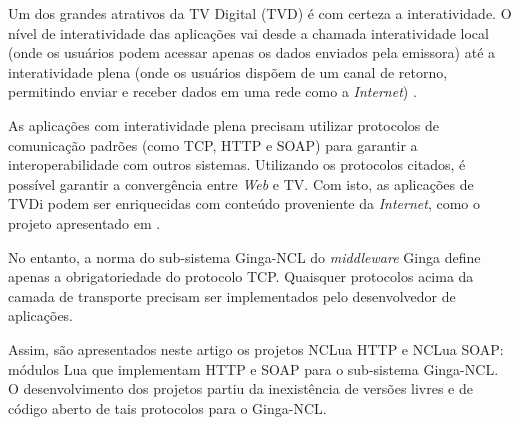 
Um dos grandes atrativos da TV Digital (TVD) é com certeza a interatividade. 
O nível de interatividade das aplicações vai desde a chamada interatividade local
(onde os usuários podem acessar apenas os dados enviados pela emissora)
até a interatividade plena (onde os usuários dispõem de um canal de retorno, permitindo
enviar e receber dados em uma rede como a \textit{Internet}) \cite{soares2009programando}. 

As aplicações com interatividade plena precisam utilizar protocolos de comunicação 
padrões (como TCP, HTTP e SOAP) para garantir a interoperabilidade
com outros sistemas. Utilizando os protocolos citados, é possível garantir a convergência entre \textit{Web} e TV.
Com isto, as aplicações de TVDi podem ser enriquecidas com conteúdo proveniente da \textit{Internet},
como o projeto apresentado em \cite{socialnets-tvd2010ghisi}.

No entanto, a norma do sub-sistema Ginga-NCL do \textit{middleware} Ginga define 
apenas a obrigatoriedade do protocolo TCP. Quaisquer protocolos acima da camada de transporte
precisam ser implementados pelo desenvolvedor de aplicações. 

Assim, são apresentados neste artigo os projetos NCLua HTTP e NCLua SOAP: módulos Lua que implementam HTTP e SOAP para o sub-sistema Ginga-NCL.
O desenvolvimento dos projetos partiu da inexistência de versões livres e de código aberto de tais protocolos para o Ginga-NCL.

